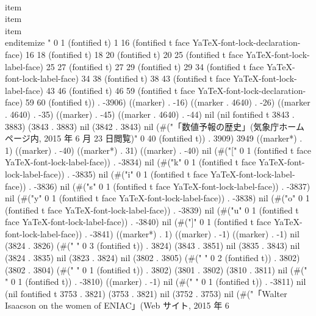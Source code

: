   \\item 
  \\item 
  \\item 
 \\end{itemize}
" 0 1 (fontified t) 1 16 (fontified t face YaTeX-font-lock-declaration-face) 16 18 (fontified t) 18 20 (fontified t) 20 25 (fontified t face YaTeX-font-lock-label-face) 25 27 (fontified t) 27 29 (fontified t) 29 34 (fontified t face YaTeX-font-lock-label-face) 34 38 (fontified t) 38 43 (fontified t face YaTeX-font-lock-label-face) 43 46 (fontified t) 46 59 (fontified t face YaTeX-font-lock-declaration-face) 59 60 (fontified t)) . -3906) ((marker) . -16) ((marker . 4640) . -26) ((marker . 4640) . -35) ((marker) . -45) ((marker . 4640) . -44) nil (nil fontified t 3843 . 3883) (3843 . 3883) nil (3842 . 3843) nil (#("「数値予報の歴史」(気象庁ホームページ内, 2015 年 6 月 23 日閲覧)" 0 40 (fontified t)) . 3909) 3949 ((marker*) . 1) ((marker) . -40) ((marker*) . 31) ((marker) . -40) nil (#("[" 0 1 (fontified t face YaTeX-font-lock-label-face)) . -3834) nil (#("k" 0 1 (fontified t face YaTeX-font-lock-label-face)) . -3835) nil (#("i" 0 1 (fontified t face YaTeX-font-lock-label-face)) . -3836) nil (#("s" 0 1 (fontified t face YaTeX-font-lock-label-face)) . -3837) nil (#("y" 0 1 (fontified t face YaTeX-font-lock-label-face)) . -3838) nil (#("o" 0 1 (fontified t face YaTeX-font-lock-label-face)) . -3839) nil (#("u" 0 1 (fontified t face YaTeX-font-lock-label-face)) . -3840) nil (#("]" 0 1 (fontified t face YaTeX-font-lock-label-face)) . -3841) ((marker*) . 1) ((marker) . -1) ((marker) . -1) nil (3824 . 3826) (#("	  " 0 3 (fontified t)) . 3824) (3843 . 3851) nil (3835 . 3843) nil (3824 . 3835) nil (3823 . 3824) nil (3802 . 3805) (#("  " 0 2 (fontified t)) . 3802) (3802 . 3804) (#(" " 0 1 (fontified t)) . 3802) (3801 . 3802) (3810 . 3811) nil (#("
" 0 1 (fontified t)) . -3810) ((marker) . -1) nil (#("	" 0 1 (fontified t)) . -3811) nil (nil fontified t 3753 . 3821) (3753 . 3821) nil (3752 . 3753) nil (#("「Walter Isaacson on the women of ENIAC」(Web サイト, 2015 年 6
